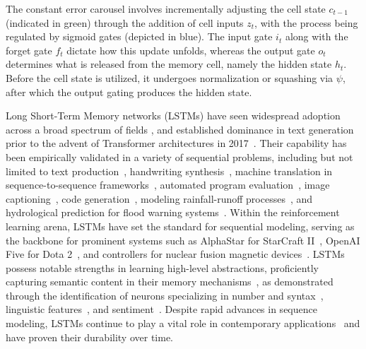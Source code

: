 The constant error carousel involves incrementally adjusting the cell state $c_{t-1}$ (indicated in green) through the addition of cell inputs $z_t$, with the process being regulated by sigmoid gates (depicted in blue). The input gate $i_t$ along with the forget gate $f_t$ dictate how this update unfolds, whereas the output gate $o_t$ determines what is released from the memory cell, namely the hidden state $h_t$. Before the cell state is utilized, it undergoes normalization or squashing via $\psi$, after which the output gating produces the hidden state.

Long Short-Term Memory networks (LSTMs) have seen widespread adoption across a broad spectrum of fields \citep{Hochreiter:01,Hochreiter:07,Schmidhuber:15}, and established dominance in text generation prior to the advent of Transformer architectures in 2017~\citep{Vaswani:17}. Their capability has been empirically validated in a variety of sequential problems, including but not limited to text production~\citep{Graves:13,Karpathy:15blog}, handwriting synthesis~\citep{Graves:13}, machine translation in sequence-to-sequence frameworks~\citep{Sutskever:14nips}, automated program evaluation~\citep{Zaremba:14arxiv}, image captioning~\citep{Karpathy:15,Hossain:19}, code generation~\citep{Karpathy:15blog}, modeling rainfall-runoff processes~\citep{Kratzert:18,Kratzert:19}, and hydrological prediction for flood warning systems~\citep{Nearing:24}. Within the reinforcement learning arena, LSTMs have set the standard for sequential modeling, serving as the backbone for prominent systems such as AlphaStar for StarCraft II~\citep{Vinyals:17short}, OpenAI Five for Dota 2~\citep{OpenAI:19}, and controllers for nuclear fusion magnetic devices~\citep{Degrave:22short}. LSTMs possess notable strengths in learning high-level abstractions, proficiently capturing semantic content in their memory mechanisms~\citep{Karpathy:15blog}, as demonstrated through the identification of neurons specializing in number and syntax~\citep{Lakretz:19}, linguistic features~\citep{Bau:19}, and sentiment~\citep{Radford:17arxiv}. Despite rapid advances in sequence modeling, LSTMs continue to play a vital role in contemporary applications~\citep{Degrave:22short,Nearing:24} and have proven their durability over time.

